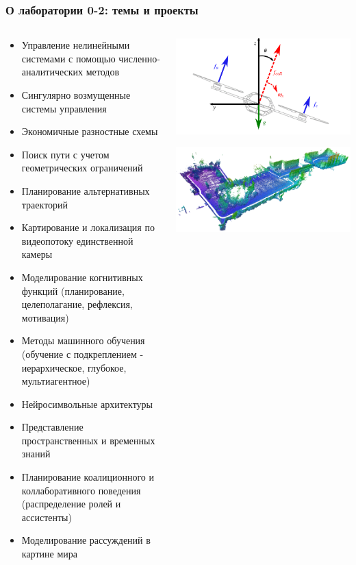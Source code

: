 \documentclass[12pt]{beamer}
\begin{document}
\begin{frame}
\frametitle{О лаборатории 0-2: темы и проекты}
	\scriptsize
	\begin{columns}
		\begin{column}{0.7\textwidth}
			\begin{itemize}
				\item Управление нелинейными системами с помощью численно-аналитических методов
				\item Сингулярно возмущенные системы управления
				\item Экономичные разностные схемы
				\item Поиск пути с учетом геометрических ограничений
				\item Планирование альтернативных траекторий
				\item Картирование и локализация по видеопотоку единственной камеры
				\item Моделирование когнитивных функций (планирование, целеполагание, рефлексия, мотивация)
				\item Методы машинного обучения (обучение с подкреплением - иерархическое, глубокое, мультиагентное)
				\item Нейросимвольные архитектуры
				\item Представление пространственных и временных знаний
				\item Планирование коалиционного и коллаборативного поведения (распределение ролей и ассистенты)
				\item Моделирование рассуждений в картине мира 
			\end{itemize}
		\end{column}
		\begin{column}{0.3\textwidth}
			\includegraphics[width=\textwidth]{proj1.png}
			
			\includegraphics[width=\textwidth]{proj2.png}
			

\end{column}
\end{columns}
\end{frame}
\end{document}
